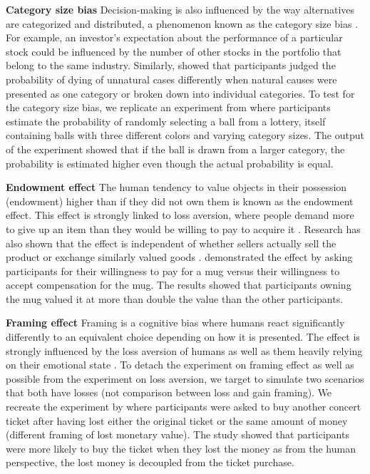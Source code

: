 \par \textbf{Category size bias} Decision-making is also influenced by the way alternatives are categorized and distributed, a phenomenon known as the category size bias \parencite{isaac2014judging}. For example, an investor's expectation about the performance of a particular stock could be influenced by the number of other stocks in the portfolio that belong to the same industry. Similarly, \textcite{tversky1994support} showed that participants judged the probability of dying of unnatural cases differently when natural causes were presented as one category or  broken down into individual categories. To test for the category size bias, we replicate an experiment from \textcite{isaac2014judging} where participants estimate the probability of randomly selecting a ball from a lottery, itself containing balls with three different colors and varying category sizes. The output of the experiment showed that if the ball is drawn from a larger category, the probability is estimated higher even though the actual probability is equal.

\par \textbf{Endowment effect} The human tendency to value objects in their possession (endowment) higher than if they did not own them is known as the endowment effect. This effect is strongly linked to loss aversion, where people demand more to give up an item than they would be willing to pay to acquire it \parencite{kahneman1990experimental}. Research has also shown that the effect is independent of whether sellers actually sell the product or exchange similarly valued goods \parencite{knetsch1989endowment}. \textcite{kahneman1990experimental} demonstrated the effect by asking participants for their willingness to pay for a mug versus their willingness to accept compensation for the mug. The results showed that participants owning the mug valued it at more than double the value than the other participants.

\par \textbf{Framing effect} Framing is a cognitive bias where humans react significantly differently to an equivalent choice depending on how it is presented. The effect is strongly influenced by the loss aversion of humans as well as them heavily relying on their emotional state \parencite{tversky1981framing}. To detach the experiment on framing effect as well as possible from the experiment on loss aversion, we target to simulate two scenarios that both have losses (not comparison between loss and gain framing). We recreate the experiment by \textcite{tversky1981framing} where participants were asked to buy another concert ticket after having lost either the original ticket or the same amount of money (different framing of lost monetary value). The study showed that participants were more likely to buy the ticket when they lost the money as from the human perspective, the lost money is decoupled from the ticket purchase.

